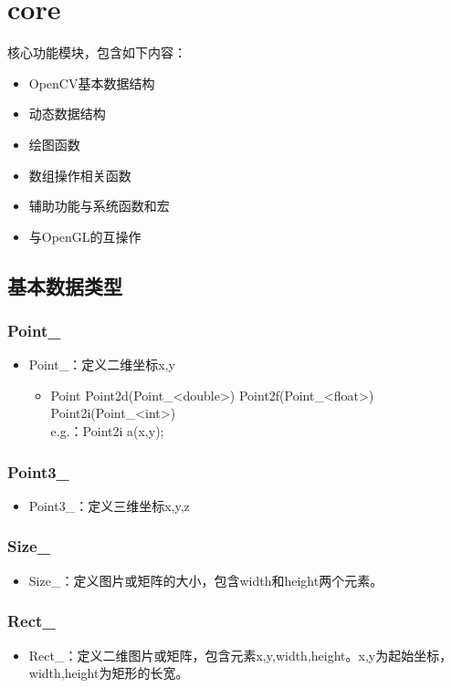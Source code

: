\documentclass[12pt]{article}
\begin{document}
\section{core}
    核心功能模块，包含如下内容：
\begin{itemize}
\item OpenCV基本数据结构
\item 动态数据结构
\item 绘图函数
\item 数组操作相关函数
\item 辅助功能与系统函数和宏
\item 与OpenGL的互操作
\end{itemize}
\subsection{基本数据类型}

\subsubsection{Point\_}
\begin{itemize}
\item Point\_：定义二维坐标x,y
	\begin{itemize}
	\item Point \quad Point2d(Point\_<double>) \quad Point2f(Point\_<float>) \quad Point2i(Point\_<int>)\\
	e.g.：Point2i a(x,y);
	\end{itemize}
\end{itemize}
	
\subsubsection{Point3\_}
\begin{itemize}
\item Point3\_：定义三维坐标x,y,z
\end{itemize}

\subsubsection{Size\_}
\begin{itemize}
\item Size\_：定义图片或矩阵的大小，包含width和height两个元素。
\end{itemize}

\subsubsection{Rect\_}
\begin{itemize}
\item Rect\_：定义二维图片或矩阵，包含元素x,y,width,height。x,y为起始坐标，width,height为矩形的长宽。
\end{itemize}
\end{document}
